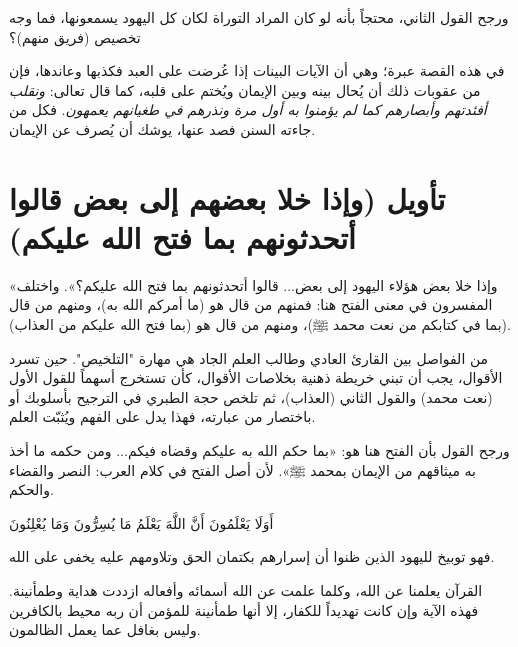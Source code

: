 ورجح  القول الثاني، محتجاً بأنه لو كان المراد التوراة لكان كل اليهود يسمعونها، فما وجه تخصيص (فريق منهم)؟

\begin{fawaid}
في هذه القصة عبرة؛ وهي أن الآيات البينات إذا عُرضت على العبد فكذبها وعاندها، فإن من عقوبات ذلك أن يُحال بينه وبين الإيمان ويُختم على قلبه، كما قال تعالى: \textit{ونقلب أفئدتهم وأبصارهم كما لم يؤمنوا به أول مرة ونذرهم في طغيانهم يعمهون}. فكل من جاءته السنن فصد عنها، يوشك أن يُصرف عن الإيمان.
\end{fawaid}

\separator

\section{تأويل (وإذا خلا بعضهم إلى بعض قالوا أتحدثونهم بما فتح الله عليكم)}
 «وإذا خلا بعض هؤلاء اليهود إلى بعض... قالوا أتحدثونهم بما فتح الله عليكم؟».
واختلف المفسرون في معنى الفتح هنا: فمنهم من قال هو (ما أمركم الله به)، ومنهم من قال (بما في كتابكم من نعت محمد ﷺ)، ومنهم من قال هو (بما فتح الله عليكم من العذاب).

\begin{fawaid}
من الفواصل بين القارئ العادي وطالب العلم الجاد هي مهارة "التلخيص". حين تسرد الأقوال، يجب أن تبني خريطة ذهنية بخلاصات الأقوال، كأن تستخرج أسهماً للقول الأول (نعت محمد) والقول الثاني (العذاب)، ثم تلخص حجة الطبري في الترجيح بأسلوبك أو باختصار من عبارته، فهذا يدل على الفهم ويُثبّت العلم.
\end{fawaid}

ورجح  القول بأن الفتح هنا هو: «بما حكم الله به عليكم وقضاه فيكم... ومن حكمه ما أخذ به ميثاقهم من الإيمان بمحمد ﷺ». لأن أصل الفتح في كلام العرب: النصر والقضاء والحكم.

 \begin{ayah}أَوَلَا يَعْلَمُونَ أَنَّ اللَّهَ يَعْلَمُ مَا يُسِرُّونَ وَمَا يُعْلِنُونَ\end{ayah} فهو توبيخ لليهود الذين ظنوا أن إسرارهم بكتمان الحق وتلاومهم عليه يخفى على الله.

\begin{fawaid}
القرآن يعلمنا عن الله، وكلما علمت عن الله أسمائه وأفعاله ازددت هداية وطمأنينة. فهذه الآية وإن كانت تهديداً للكفار، إلا أنها طمأنينة للمؤمن أن ربه محيط بالكافرين وليس بغافل عما يعمل الظالمون.
\end{fawaid}

